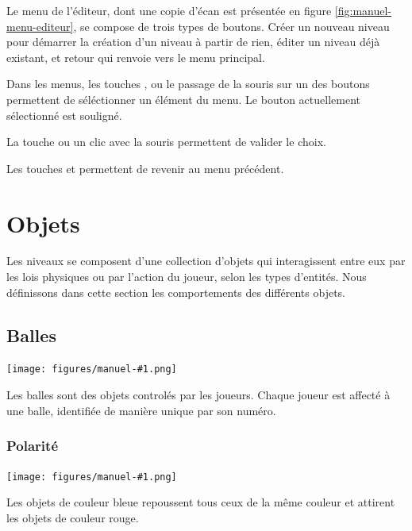 Le menu de l'éditeur, dont une copie d'écan est présentée en figure
\ref{fig:manuel-menu-editeur}, se compose de trois types de boutons.
Créer un nouveau niveau pour démarrer la création d'un niveau à partir
de rien, éditer un niveau déjà existant, et retour qui renvoie vers
le menu principal.

Dans les menus, les touches \fbox{$\uparrow$}, \fbox{$\downarrow$} ou
le passage de la souris sur un des boutons permettent de séléctionner un
élément du menu. Le bouton actuellement sélectionné est souligné.

La touche  ou un clic avec la souris permettent de valider le choix.

Les touches \fbox{$\longleftarrow$} et  permettent de revenir
au menu précédent.

\section{Objets}
\newcommand{\objectsymbol}[1]{
    \texttt{[image: figures/manuel-\#1.png]}
}

\newcommand{\describeobject}[2]{
    \noindent
    \begin{minipage}{.08\textwidth}
        \objectsymbol{#1}
    \end{minipage}
    \begin{minipage}{.9\textwidth}
        #2
    \end{minipage}
}

Les niveaux se composent d'une collection d'objets qui
interagissent entre eux par les lois physiques ou par
l'action du joueur, selon les types d'entités. Nous
définissons dans cette section les comportements
des différents objets.

\subsection{Balles}

\describeobject{ball}{
    Les balles sont des objets controlés par les joueurs. Chaque joueur
    est affecté à une balle, identifiée de manière unique par son numéro.
}

\subsubsection{Polarité}

\describeobject{charge-neg}{
    Les objets de couleur bleue repoussent tous ceux de la même couleur
    et attirent les objets de couleur rouge.
}

